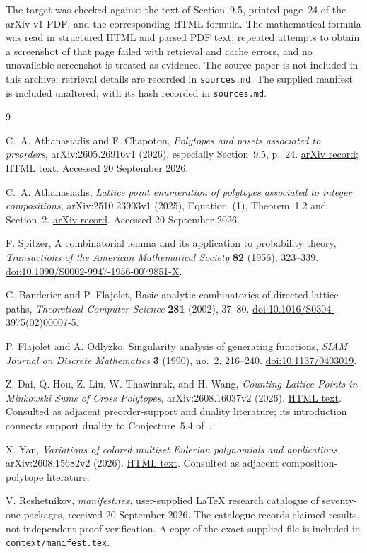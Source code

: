 \documentclass[11pt]{article}
\numberwithin{equation}{section}
\theoremstyle{definition}
\begin{document}
The target was checked against the text of Section~9.5, printed page~24 of
the arXiv v1 PDF, and the corresponding HTML formula. The mathematical formula
was read in structured HTML and parsed PDF text; repeated attempts to obtain a
screenshot of that page failed with retrieval and cache errors, and no
unavailable screenshot is treated as evidence.
The source paper is not included in this archive; retrieval details are
recorded in \texttt{sources.md}. The supplied manifest is included unaltered,
with its hash recorded in \texttt{sources.md}.

\begin{thebibliography}{9}
\raggedright

C.~A. Athanasiadis and F. Chapoton,
\emph{Polytopes and posets associated to preorders},
arXiv:2605.26916v1 (2026), especially Section~9.5, p.~24.
\href{https://arxiv.org/abs/2605.26916v1}{arXiv record};
\href{https://arxiv.org/html/2605.26916v1}{HTML text}.
Accessed 20 September 2026.

C.~A. Athanasiadis,
\emph{Lattice point enumeration of polytopes associated to integer compositions},
arXiv:2510.23903v1 (2025), Equation~(1), Theorem~1.2 and Section~2.
\href{https://arxiv.org/abs/2510.23903v1}{arXiv record}.
Accessed 20 September 2026.

F. Spitzer,
A combinatorial lemma and its application to probability theory,
\emph{Transactions of the American Mathematical Society}
\textbf{82} (1956), 323--339.
\href{https://doi.org/10.1090/S0002-9947-1956-0079851-X}
{doi:10.1090/S0002-9947-1956-0079851-X}.

C. Banderier and P. Flajolet,
Basic analytic combinatorics of directed lattice paths,
\emph{Theoretical Computer Science} \textbf{281} (2002), 37--80.
\href{https://doi.org/10.1016/S0304-3975(02)00007-5}
{doi:10.1016/S0304-3975(02)00007-5}.

P. Flajolet and A. Odlyzko,
Singularity analysis of generating functions,
\emph{SIAM Journal on Discrete Mathematics} \textbf{3} (1990), no.~2,
216--240.
\href{https://doi.org/10.1137/0403019}{doi:10.1137/0403019}.

Z. Dai, Q. Hou, Z. Liu, W. Thawinrak, and H. Wang,
\emph{Counting Lattice Points in Minkowski Sums of Cross Polytopes},
arXiv:2608.16037v2 (2026).
\href{https://arxiv.org/html/2608.16037v2}{HTML text}.
Consulted as adjacent preorder-support and duality literature; its
introduction connects support duality to Conjecture~5.4 of~\cite{AC}.

X. Yan,
\emph{Variations of colored multiset Eulerian polynomials and applications},
arXiv:2608.15682v2 (2026).
\href{https://arxiv.org/html/2608.15682v2}{HTML text}.
Consulted as adjacent composition-polytope literature.

V. Reshetnikov,
\emph{manifest.tex}, user-supplied \LaTeX{} research catalogue of
seventy-one packages, received 20 September 2026. The catalogue records
claimed results, not independent proof verification. A copy of the exact
supplied file is included in \texttt{context/manifest.tex}.

\end{thebibliography}
\end{document}

